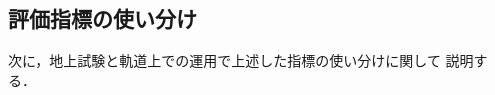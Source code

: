 \documentclass[11pt]{jsreport}
\begin{document}

\subsection{評価指標の使い分け}
次に，地上試験と軌道上での運用で上述した指標の使い分けに関して
説明する．

\end{document}
